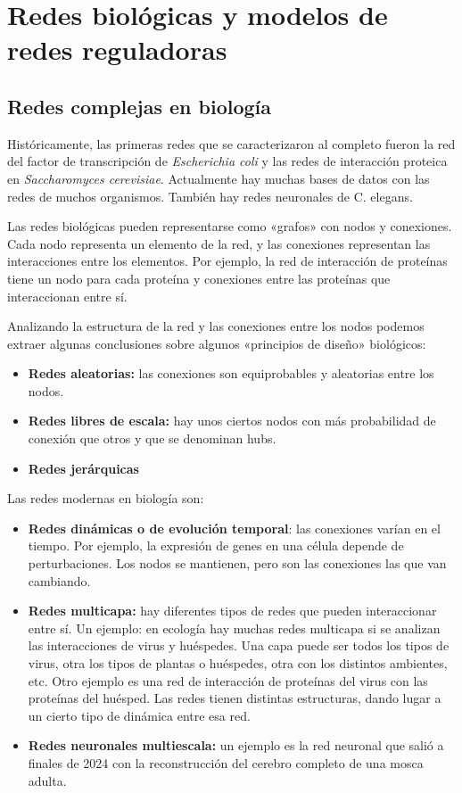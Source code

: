 \chapter{Redes biológicas y modelos de redes reguladoras}
\section{Redes complejas en biología}
Históricamente, las primeras redes que se caracterizaron al completo fueron la red del factor de transcripción de \textit{Escherichia coli} y las redes de interacción proteica en \textit{Saccharomyces cerevisiae}. Actualmente hay muchas bases de datos con las redes de muchos organismos. También hay redes neuronales de C. elegans. 

Las redes biológicas pueden representarse como «grafos» con nodos y conexiones. Cada nodo representa un elemento de la red, y las conexiones representan las interacciones entre los elementos.
Por ejemplo, la red de interacción de proteínas tiene un nodo para cada proteína y conexiones entre las proteínas que interaccionan entre sí. 

Analizando la estructura de la red y las conexiones entre los nodos podemos extraer algunas conclusiones sobre algunos «principios de diseño» biológicos:
\begin{itemize}
\item \textbf{Redes aleatorias:} las conexiones son equiprobables y aleatorias entre los nodos.
\item \textbf{Redes libres de escala:} hay unos ciertos nodos con más probabilidad de conexión que otros y que se denominan hubs. 
\item \textbf{Redes jerárquicas}
\end{itemize}

Las redes modernas en biología son:
\begin{itemize}
\item \textbf{Redes dinámicas o de evolución temporal}: las conexiones varían en el tiempo. Por ejemplo, la expresión de genes en una célula depende de perturbaciones. Los nodos se mantienen, pero son las conexiones las que van cambiando. 
\item \textbf{Redes multicapa:} hay diferentes tipos de redes que pueden interaccionar entre sí. Un ejemplo: en ecología hay muchas redes multicapa si se analizan las interacciones de virus y huéspedes. Una capa puede ser todos los tipos de virus, otra los tipos de plantas o huéspedes, otra con los distintos ambientes, etc. Otro ejemplo es una red de interacción de proteínas del virus con las proteínas del huésped. Las redes tienen distintas estructuras, dando lugar a un cierto tipo de dinámica entre esa red.
\item \textbf{Redes neuronales multiescala:} un ejemplo es la red neuronal que salió a finales de 2024 con la reconstrucción del cerebro completo de una mosca adulta. 
\end{itemize}

